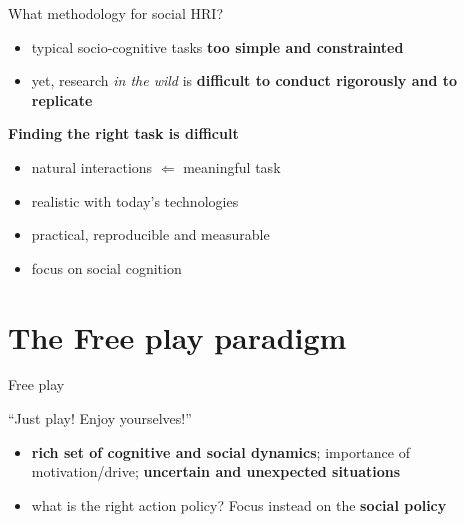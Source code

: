 \documentclass[compress]{beamer}
\begin{document}

\begin{frame}{What methodology for social HRI?}

    \begin{itemize}
        \item typical socio-cognitive tasks \textbf{too simple and
            constrainted}
        \item yet, research \emph{in the wild} is \textbf{difficult to conduct
            rigorously and to replicate}
    \end{itemize}

    \pause

    \textbf{Finding the right task is difficult}

    \begin{itemize}
        \item natural interactions $\Leftarrow$ meaningful task
        \item realistic with today's technologies
        \item practical, reproducible and measurable
        \item focus on social cognition
    \end{itemize}
\end{frame}




\section[Free play]{The Free play paradigm}


\begin{frame}{Free play}

    \begin{center}
    {\Large ``Just play! Enjoy yourselves!''}
    \end{center}

    \vspace{3em}

    \begin{itemize}
        \item \textbf{rich set of cognitive and
            social dynamics}; importance of motivation/drive; \textbf{uncertain
            and unexpected situations}
        \item what is the right action policy? Focus instead on the \textbf{social policy}
    \end{itemize}


\end{frame}
\end{document}
